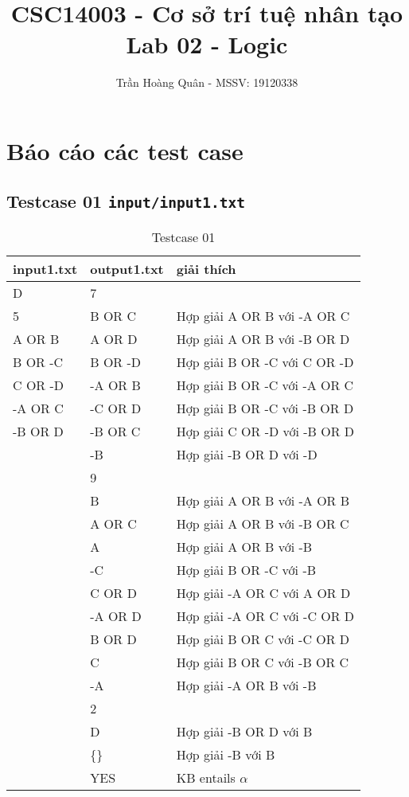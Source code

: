 \documentclass[12pt]{article}
\title{
	CSC14003 - Cơ sở trí tuệ nhân tạo\\
	Lab 02 - Logic
}
\author{Trần Hoàng Quân - MSSV: 19120338}
\begin{document}
\maketitle
\tableofcontents
\pagebreak

\section{Báo cáo các test case}
\subsection{Testcase 01 \texttt{input/input1.txt}}
\begin{table}[H]
    \centering
    \begin{tabular}{|l|l|l|}
        \hline
        input1.txt & output1.txt & giải thích  \\
        \hline
        D & 7 & \\
        5 & B OR C & Hợp giải A OR B với -A OR C \\
        A OR B & A OR D & Hợp giải A OR B với -B OR D \\
        B OR -C & B OR -D & Hợp giải B OR -C với C OR -D \\
        C OR -D & -A OR B & Hợp giải B OR -C với -A OR C \\
        -A OR C & -C OR D & Hợp giải B OR -C với -B OR D \\
        -B OR D & -B OR C & Hợp giải C OR -D với -B OR D \\
         & -B & Hợp giải -B OR D với -D \\
         & 9 & \\
         & B & Hợp giải A OR B với -A OR B \\
         & A OR C & Hợp giải A OR B với -B OR C \\
         & A & Hợp giải A OR B với -B \\
         & -C & Hợp giải B OR -C với -B \\
         & C OR D & Hợp giải -A OR C với A OR D \\
         & -A OR D & Hợp giải -A OR C với -C OR D \\
         & B OR D & Hợp giải B OR C với -C OR D \\
         & C & Hợp giải B OR C với -B OR C \\
         & -A & Hợp giải -A OR B với -B \\
         & 2 & \\
         & D & Hợp giải -B OR D với B \\
         & \{\} & Hợp giải -B với B \\
         & YES & KB entails $\alpha$\\
        \hline
    \end{tabular}
    \caption{Testcase 01}
\end{table}
\end{document}
